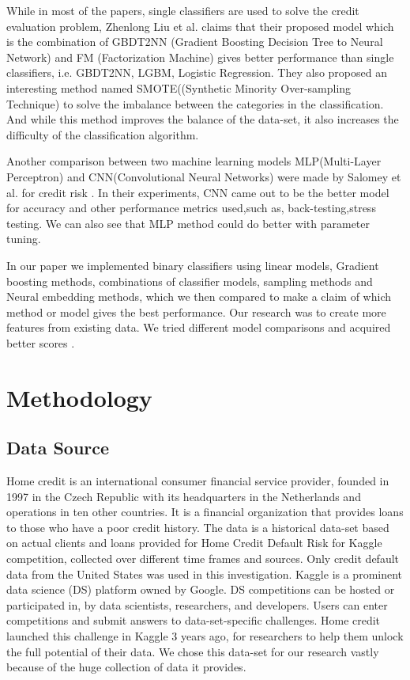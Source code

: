 \documentclass[sigconf, nonacm]{acmart}
\begin{document}
While in most of the papers, single classifiers are used to solve the credit evaluation problem,  Zhenlong Liu et al. \cite{liu_zhang_2021} claims that their proposed model which is the combination of GBDT2NN (Gradient Boosting Decision Tree to Neural Network) and FM (Factorization Machine) gives better performance than single classifiers, i.e. GBDT2NN, LGBM, Logistic Regression. They also proposed an interesting method named SMOTE((Synthetic Minority Over-sampling Technique) to solve the imbalance between the categories in the classification. And while this method improves the balance of the data-set, it also increases the difficulty of the classification algorithm.

Another comparison between two machine learning models MLP(Multi-Layer Perceptron) and CNN(Convolutional Neural Networks) were made by  Salomey et al. \cite{Osei_2021} for credit risk . In their experiments, CNN came out to be the better model for accuracy and other performance metrics used,such as, back-testing,stress testing. We can also see that MLP method could do better with parameter tuning.


In our paper we implemented  binary classifiers using linear models, Gradient boosting methods, combinations of classifier models, sampling methods and Neural embedding methods, which we then compared to make a claim of which method or model gives the best performance. Our research was to create more features from existing data. We tried different model comparisons and acquired better scores .

\section{Methodology}
\subsection{Data Source}
Home credit is an international consumer financial service provider, founded in 1997 in the Czech Republic with its headquarters in the Netherlands and operations in ten other countries. It is a financial organization that provides loans to those who have a poor credit history.
The data\cite{data-set} is a historical data-set based on actual clients and loans provided for Home Credit Default Risk for Kaggle competition, collected over different time frames and sources. Only credit default data from the United States was used in this investigation. Kaggle is a prominent data science (DS) platform owned by Google. DS competitions can be hosted or participated in, by data scientists, researchers, and developers. Users can enter competitions and submit answers to data-set-specific challenges. Home credit launched this challenge in Kaggle 3 years ago, for researchers to help them unlock the full potential of their data.
We chose this data-set for our research vastly because of the huge collection of data it provides.
\end{document}
